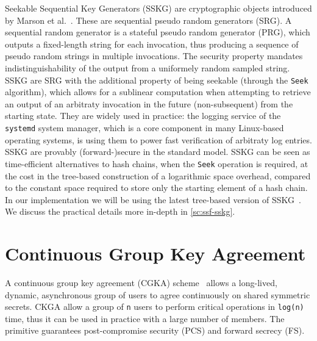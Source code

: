 Seekable Sequential Key Generators (SSKG) are cryptographic objects introduced by Marson et al.~\cite{ESORICS:MarPoe13}.
These are sequential pseudo random generators (SRG).
A sequential random generator is a stateful pseudo random generator (PRG), 
which outputs a fixed-length string for each invocation, 
thus producing a sequence of pseudo random strings in multiple invocations.
The security property mandates indistinguishability of the output from a uniformely random sampled string.
SSKG are SRG with the additional property of being seekable (through the \texttt{Seek} algorithm), 
which allows for a sublinear computation when attempting 
to retrieve an output of an arbitraty invocation in the future (non-subsequent)
from the starting state.
They are widely used in practice:
the logging service of the \texttt{systemd} system manager,
which is a core component in many Linux-based operating systems,
is using them to power fast verification of arbitraty log entries.
SSKG are provably (forward-)secure in the standard model.
SSKG can be seen as time-efficient alternatives to hash chains,
when the \texttt{Seek} operation is required, at the cost in the tree-based construction
of a logarithmic space overhead, compared to the constant space required to store 
only the starting element of a hash chain.
In our implementation we will be using the latest tree-based version of SSKG~\cite{ESORICS:MarPoe14}.
We discuss the practical details more in-depth in \cref{sc:ssf-sskg}.

\section{Continuous Group Key Agreement}\label{sc:CGKA}

A continuous group key agreement (CGKA) scheme~\cite{C:ACDT20}
allows a long-lived, dynamic, asynchronous group of users to agree 
continuously on shared symmetric secrets.
CKGA allow a group of \texttt{n} users to perform critical 
operations in \texttt{log(n)} time,
thus it can be used in practice with a large number of members.
The primitive guarantees post-compromise security (PCS) and forward secrecy (FS).

